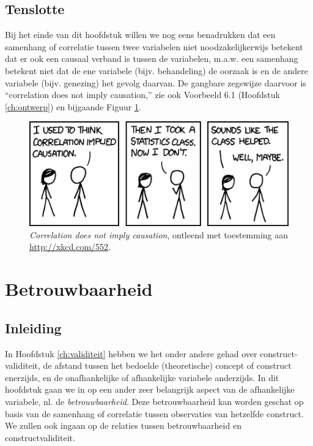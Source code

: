 \documentclass[
]{book}
\begin{document}
\hypertarget{sec:correlationcausation}{%
\section{Tenslotte}\label{sec:correlationcausation}}

Bij het einde van dit hoofdstuk willen we nog eens benadrukken dat een
samenhang of correlatie tussen twee variabelen niet noodzakelijkerwijs
betekent dat er ook een causaal verband is tussen de variabelen, m.a.w.
een samenhang betekent niet dat de ene variabele (bijv. behandeling) de
oorzaak is en de andere variabele (bijv. genezing) het gevolg daarvan.
De gangbare zegswijze daarvoor is ``correlation does not imply
causation,'' zie ook Voorbeeld 6.1 (Hoofdstuk \ref{ch:ontwerp})
en bijgaande Figuur \ref{fig:xkcd552}.

\begin{figure}
\centering
\includegraphics{figures/correlation.png}
\caption{\label{fig:xkcd552}\emph{Correlation does not imply causation}, ontleend met toestemming aan \url{http://xkcd.com/552}.}
\end{figure}

\hypertarget{ch:betrouwbaarheid}{%
\chapter{Betrouwbaarheid}\label{ch:betrouwbaarheid}}

\hypertarget{inleiding-6}{%
\section{Inleiding}\label{inleiding-6}}

In Hoofdstuk \ref{ch:validiteit} hebben we het onder andere gehad over
construct-validiteit, de afstand tussen het bedoelde (theoretische)
concept of construct enerzijds, en de onafhankelijke of afhankelijke
variabele anderzijds. In dit hoofdstuk gaan we in op een ander zeer
belangrijk aspect van de afhankelijke variabele, nl. de
\emph{betrouwbaarheid}. Deze betrouwbaarheid kan worden geschat op basis van
de samenhang of correlatie tussen observaties van hetzelfde construct.
We zullen ook ingaan op de relaties tussen betrouwbaarheid en
constructvaliditeit.
\end{document}
